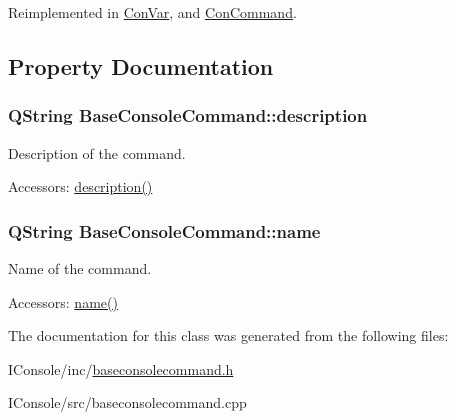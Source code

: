 Reimplemented in \hyperlink{class_con_var_aadc6d792abbb1e4b431611d20b8db595}{Con\-Var}, and \hyperlink{class_con_command_ab2591a1c31847e9746520e9958ba0f9a}{Con\-Command}.



\subsection{Property Documentation}
\hypertarget{class_base_console_command_afcb44c52f870b7ca902da018c365b758}{
\subsubsection[{description}]{\setlength{\rightskip}{0pt plus 5cm}Q\-String Base\-Console\-Command\-::description\hspace{0.3cm}{\ttfamily [read]}}}\label{class_base_console_command_afcb44c52f870b7ca902da018c365b758}


Description of the command. 

\begin{DoxyParagraph}{Accessors\-:}
\hyperlink{class_base_console_command_afcb44c52f870b7ca902da018c365b758}{description()} 
\end{DoxyParagraph}
\hypertarget{class_base_console_command_a2f21764f46a3864a362eae2e3396e363}{
\subsubsection[{name}]{\setlength{\rightskip}{0pt plus 5cm}Q\-String Base\-Console\-Command\-::name\hspace{0.3cm}{\ttfamily [read]}}}\label{class_base_console_command_a2f21764f46a3864a362eae2e3396e363}


Name of the command. 

\begin{DoxyParagraph}{Accessors\-:}
\hyperlink{class_base_console_command_a2f21764f46a3864a362eae2e3396e363}{name()} 
\end{DoxyParagraph}


The documentation for this class was generated from the following files\-:\begin{DoxyCompactItemize}
\item 
I\-Console/inc/\hyperlink{baseconsolecommand_8h}{baseconsolecommand.\-h}\item 
I\-Console/src/baseconsolecommand.\-cpp\end{DoxyCompactItemize}
